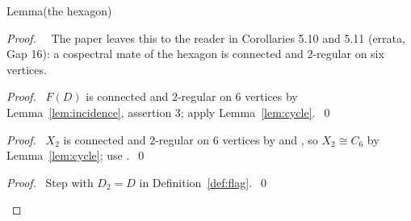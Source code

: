 \begin{namedresult}{Lemma}{(the hexagon)}\label{lem:hexagon}
\end{namedresult}
\begin{proof}
 \pfsketch\ \repair\ The paper leaves this to the reader in Corollaries 5.10 and 5.11 (errata,
 Gap 16): a cospectral mate of the hexagon is connected and $2$-regular on six vertices.
 \begin{proof}\pf\ $F(D)$ is connected and $2$-regular on $6$ vertices by
  Lemma~\ref{lem:incidence}, assertion 3; apply Lemma~\ref{lem:cycle}.~\qed\end{proof}
 \begin{proof}\pf\ $X_2$ is connected and $2$-regular on $6$ vertices by  and
  , so $X_2\cong C_6$ by Lemma~\ref{lem:cycle}; use
  .~\qed\end{proof}
 \qedstep
 \begin{proof}\pf\ Step  with $D_2=D$ in Definition~\ref{def:flag}.~\qed\end{proof}
\end{proof}

